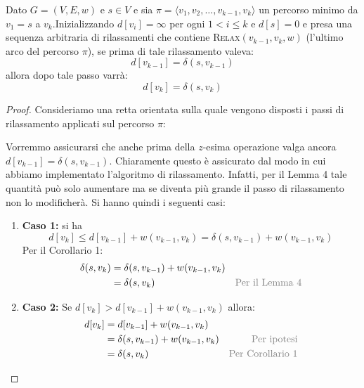 \begin{lemmabox}
		Dato $G=(V,E,w)$ e $s \in V$ e sia $\pi = \langle v_{1}, v_{2}, \ldots,v_{k-1}, v_{k} \rangle$ un percorso minimo da $v_{1}=s$ a $v_{k}$.Inizializzando $d[v_{i}] = \infty$ per ogni $1<i\leq k$ e $d[s]=0$ e presa una sequenza arbitraria di rilassamenti che contiene \textsc{Relax}$(v_{k-1},v_{k},w)$ (l'ultimo arco del percorso $\pi$), se prima di tale rilassamento valeva:
	\begin{displaymath}
		d[v_{k-1}] = \delta(s,v_{k-1})
	\end{displaymath}
allora dopo tale passo varrà:
\begin{displaymath}
	d[v_{k}] = \delta(s,v_{k})
\end{displaymath}
\end{lemmabox}

\begin{proof}
	Consideriamo una retta orientata sulla quale vengono disposti i passi di rilassamento applicati sul percorso $\pi$:
\begin{center}
\end{center}
Vorremmo assicurarsi che anche prima della $z$-esima operazione valga ancora $d[v_{k-1}] = \delta(s,v_{k-1})$. Chiaramente questo è  assicurato dal modo in cui abbiamo implementato l'algoritmo di rilassamento. Infatti, per il Lemma 4 tale quantità può solo aumentare ma se diventa più grande il passo di rilassamento non lo modificherà. Si hanno quindi i seguenti casi:
\begin{enumerate}
	\item \textbf{Caso 1:} si ha \[d[v_{k}]\leq d[v_{k-1}]+w(v_{k-1},v_{k}) = \delta(s,v_{k-1}) + w(v_{k-1},v_{k}) \]
	Per il Corollario 1:
	\begin{align*}
		\delta(s,v_{k}) &= \delta(s,v_{k-1}) + w(v_{k-1},v_{k})\\
		&= \delta(s,v_{k}) & \text{\textcolor{gray}{Per il Lemma 4}}
	\end{align*}
\item \textbf{Caso 2:} Se $d[v_{k}]> d[v_{k-1}]+w(v_{k-1},v_{k})$ allora:
\begin{align*}
	d[v_{k}] &= d[v_{k-1}]+w(v_{k-1},v_{k})\\
	&= \delta(s,v_{k-1}) + w(v_{k-1},v_{k}) & \text{\textcolor{gray}{Per ipotesi}}\\
	&= \delta(s,v_{k}) & \text{\textcolor{gray}{Per Corollario 1}}
\end{align*}
\end{enumerate}
\end{proof}

